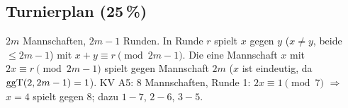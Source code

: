 \subsection*{Turnierplan (25\,\%)}
$2m$ Mannschaften, $2m-1$ Runden. In Runde $r$ spielt $x$ gegen $y$ ($x \ne y$, beide $\le 2m-1$) mit $x + y \equiv r \pmod{2m-1}$.
Die eine Mannschaft $x$ mit $2x \equiv r \pmod{2m-1}$ spielt gegen Mannschaft $2m$ ($x$ ist eindeutig, da $\operatorname{ggT}(2, 2m-1) = 1$).
KV A5: 8 Mannschaften, Runde 1: $2x \equiv 1 \pmod 7$ $\Rightarrow$ $x = 4$ spielt gegen 8; dazu $1\!-\!7$, $2\!-\!6$, $3\!-\!5$.

\clearpage



